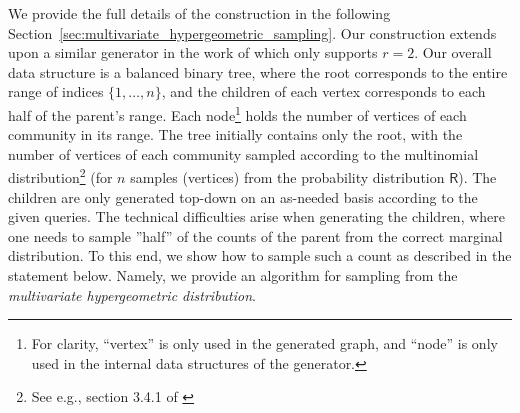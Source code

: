 We provide the full details of the construction in the following Section~\ref{sec:multivariate_hypergeometric_sampling}.
Our construction extends upon a similar generator in the work of \cite{huge} which only supports $r = 2$.
Our overall data structure is a balanced binary tree,
where the root corresponds to the entire range of indices $\{1, \ldots, n\}$,
and the children of each vertex corresponds to each half of the parent's range.
Each node\footnote{For clarity, ``vertex'' is only used in the generated graph,
and ``node'' is only used in the internal data structures of the generator.}
holds the number of vertices of each community in its range.
The tree initially contains only the root,
with the number of vertices of each community sampled according
to the multinomial distribution\footnote{See e.g., section 3.4.1 of \cite{knuth}}
(for $n$ samples (vertices) from the probability distribution $\mathsf{R}$).
The children are only generated top-down on an as-needed basis according to the given queries.
The technical difficulties arise when generating the children,
where one needs to sample ''half'' of the counts of the parent from the correct marginal distribution.
To this end, we show how to sample such a count as described in the statement below.
Namely, we provide an algorithm for sampling from the \emph{multivariate hypergeometric distribution}.
